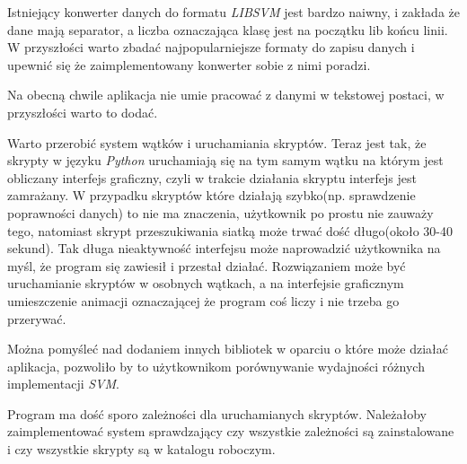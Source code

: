 \documentclass[paper=a4, fontsize=11pt]{scrartcl} %
\numberwithin{equation}{section} %
\numberwithin{figure}{section} %
\begin{document}
    \par Istniejący konwerter danych do formatu \textit{LIBSVM} jest bardzo naiwny, i zakłada
    że dane mają separator, a liczba oznaczająca klasę jest na początku lib końcu linii. W
    przyszłości warto zbadać najpopularniejsze formaty do zapisu danych i upewnić się że
    zaimplementowany konwerter sobie z nimi poradzi.

    \par Na obecną chwile aplikacja nie umie pracować z danymi w tekstowej postaci, w
    przyszłości warto to dodać. 

    \par Warto przerobić system wątków i uruchamiania skryptów. Teraz jest tak, że skrypty w
    języku \textit{Python} uruchamiają się na tym samym wątku na którym jest obliczany
    interfejs graficzny, czyli w trakcie działania skryptu interfejs jest zamrażany. W
    przypadku skryptów które działają szybko(np. sprawdzenie poprawności danych) to nie ma
    znaczenia, użytkownik po prostu nie zauważy tego, natomiast skrypt przeszukiwania siatką
    może trwać dość długo(około 30-40 sekund). Tak długa nieaktywność interfejsu może
    naprowadzić użytkownika na myśl, że program się zawiesił i przestał działać. Rozwiązaniem
    może być uruchamianie skryptów w osobnych wątkach, a na interfejsie graficznym umieszczenie
    animacji oznaczającej że program coś liczy i nie trzeba go przerywać. 
    
    \par Można pomyśleć nad dodaniem innych bibliotek w oparciu o które może działać aplikacja,
    pozwoliło by to użytkownikom porównywanie wydajności różnych implementacji \textit{SVM}.

    \par Program ma dość sporo zależności dla uruchamianych skryptów. Należałoby
    zaimplementować system sprawdzający czy wszystkie zależności są zainstalowane i czy
    wszystkie skrypty są w katalogu roboczym.
     

\newpage
\nocite{*}
\printbibliography[title={Źródła}]
\end{document}
